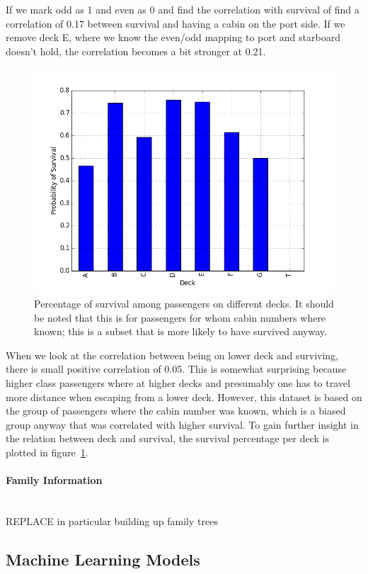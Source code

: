 \documentclass[english, a4paper]{article}
\begin{document}
If we mark odd as 1 and even as 0 and find the correlation with survival of find a correlation of 0.17 between survival and having a cabin on the port side. If we remove deck E, where we know the even/odd mapping to port and starboard doesn't hold, the correlation becomes a bit stronger at 0.21.
\begin{figure}[H]
    \includegraphics[width=\linewidth]{survival_per_deck}
    \caption{Percentage of survival among passengers on different decks. It should be noted that this is for passengers for whom cabin numbers where known; this is a subset that is more likely to have survived anyway.}
    \label{fig:survival_per_deck}
\end{figure}
\noindent
When we look at the correlation between being on lower deck and surviving, there is small positive correlation of 0.05. This is somewhat surprising because higher class passengers where at higher decks and presumably one has to travel more distance when escaping from a lower deck. However, this dataset is based on the group of passengers where the cabin number was known, which is a biased group anyway that was correlated with higher survival. To gain further insight in the relation between deck and survival, the survival percentage per deck is plotted in figure~\ref{fig:survival_per_deck}.

\paragraph{Family Information}~\\
REPLACE in particular building up family trees
\subsection{Machine Learning Models}
\label{subsec:titanic_machine_learning_models}
\end{document}
